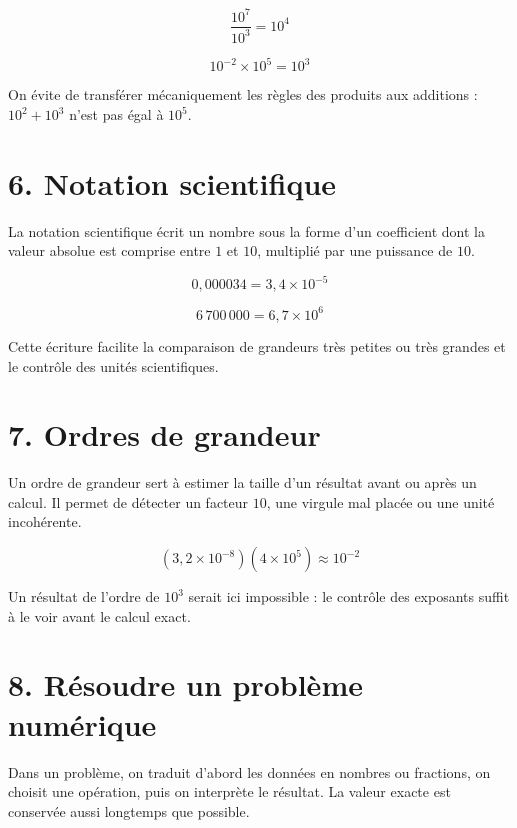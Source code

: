 \[
\dfrac{10^7}{10^3}=10^4
\]

\[
10^{-2}\times10^5=10^3
\]

\begin{exemple}
On évite de transférer mécaniquement les règles des produits aux additions : $10^2+10^3$ n’est pas égal à $10^5$.
\end{exemple}


\section{6. Notation scientifique}
La notation scientifique écrit un nombre sous la forme d’un coefficient dont la valeur absolue est comprise entre $1$ et $10$, multiplié par une puissance de $10$.

\[
0{,}000034=3{,}4\times10^{-5}
\]

\[
6\,700\,000=6{,}7\times10^6
\]

\begin{exemple}
Cette écriture facilite la comparaison de grandeurs très petites ou très grandes et le contrôle des unités scientifiques.
\end{exemple}

\section{7. Ordres de grandeur}
Un ordre de grandeur sert à estimer la taille d’un résultat avant ou après un calcul. Il permet de détecter un facteur $10$, une virgule mal placée ou une unité incohérente.

\[
(3{,}2\times10^{-8})(4\times10^5)\approx10^{-2}
\]

\begin{exemple}
Un résultat de l’ordre de $10^3$ serait ici impossible : le contrôle des exposants suffit à le voir avant le calcul exact.
\end{exemple}

\section{8. Résoudre un problème numérique}
Dans un problème, on traduit d’abord les données en nombres ou fractions, on choisit une opération, puis on interprète le résultat. La valeur exacte est conservée aussi longtemps que possible.

